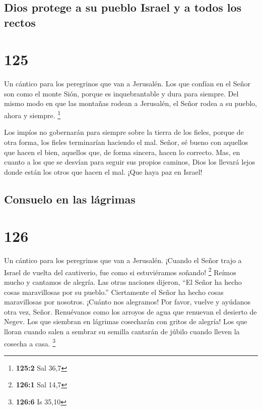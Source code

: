 \hypertarget{dios-protege-a-su-pueblo-israel-y-a-todos-los-rectos}{%
\subsection{Dios protege a su pueblo Israel y a todos los
rectos}\label{dios-protege-a-su-pueblo-israel-y-a-todos-los-rectos}}

\hypertarget{section-124}{%
\section{125}\label{section-124}}

Un cántico para los peregrinos que van a Jerusalén.  Los que
confían en el Señor son como el monte Sión, porque es inquebrantable y
dura para siempre.  Del mismo modo en que las montañas
rodean a Jerusalén, el Señor rodea a su pueblo, ahora y siempre.
\footnote{\textbf{125:2} Sal 36,7}

 Los impíos no gobernarán para siempre sobre la tierra de
los fieles, porque de otra forma, los fieles terminarían haciendo el
mal.  Señor, sé bueno con aquellos que hacen el bien,
aquellos que, de forma sincera, hacen lo correcto.  Mas, en
cuanto a los que se desvían para seguir sus propios caminos, Dios los
llevará lejos donde están los otros que hacen el mal. ¡Que haya paz en
Israel!

\hypertarget{consuelo-en-las-luxe1grimas}{%
\subsection{Consuelo en las
lágrimas}\label{consuelo-en-las-luxe1grimas}}

\hypertarget{section-125}{%
\section{126}\label{section-125}}

Un cántico para los peregrinos que van a Jerusalén.  ¡Cuando
el Señor trajo a Israel de vuelta del cautiverio, fue como si
estuviéramos soñando! \footnote{\textbf{126:1} Sal 14,7} 
Reímos mucho y cantamos de alegría. Las otras naciones dijeron, ``El
Señor ha hecho cosas maravillosas por su pueblo.'' 
Ciertamente el Señor ha hecho cosas maravillosas por nosotros. ¡Cuánto
nos alegramos!  Por favor, vuelve y ayúdanos otra vez,
Señor. Renuévanos como los arroyos de agua que renuevan el desierto de
Negev.  Los que siembran en lágrimas cosecharán con gritos
de alegría!  Los que lloran cuando salen a sembrar su
semilla cantarán de júbilo cuando lleven la cosecha a casa. \footnote{\textbf{126:6}
  Is 35,10}

